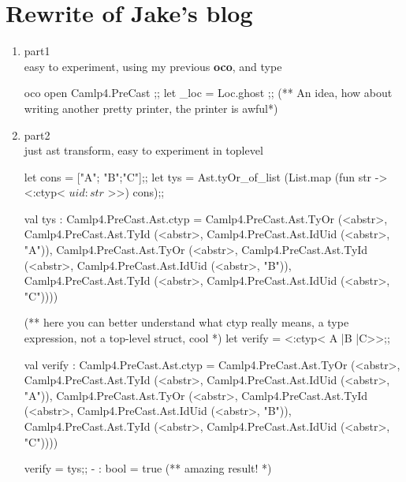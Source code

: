 \section {Rewrite of Jake's blog}
  \begin{enumerate}
  \item part1 \\
    easy to experiment, using my previous {\bf oco},
    and type

    \begin{bluecode}
oco       
open Camlp4.PreCast ;;
let _loc = Loc.ghost ;;
(** An idea, how about writing another pretty printer, the printer is awful*)
\end{bluecode}

\item part2 \\ 
  just ast transform, easy to experiment in toplevel
  

\begin{redcode}
let cons = ["A"; "B";"C"];;
let tys = Ast.tyOr_of_list (List.map (fun str -> <:ctyp< $uid:str$ >>) cons);;
\end{redcode}

\begin{bluecode}
val tys : Camlp4.PreCast.Ast.ctyp =
  Camlp4.PreCast.Ast.TyOr (<abstr>,
   Camlp4.PreCast.Ast.TyId (<abstr>, Camlp4.PreCast.Ast.IdUid (<abstr>, "A")),
   Camlp4.PreCast.Ast.TyOr (<abstr>,
    Camlp4.PreCast.Ast.TyId (<abstr>,
     Camlp4.PreCast.Ast.IdUid (<abstr>, "B")),
    Camlp4.PreCast.Ast.TyId (<abstr>,
     Camlp4.PreCast.Ast.IdUid (<abstr>, "C"))))
\end{bluecode}
   
\begin{redcode}
(** here you can better understand what ctyp really means, a type
expression, not a top-level struct, cool 
*)
let verify = <:ctyp< A |B |C>>;;
\end{redcode}

\begin{bluecode}
val verify : Camlp4.PreCast.Ast.ctyp =
  Camlp4.PreCast.Ast.TyOr (<abstr>,
   Camlp4.PreCast.Ast.TyId (<abstr>, Camlp4.PreCast.Ast.IdUid (<abstr>, "A")),
   Camlp4.PreCast.Ast.TyOr (<abstr>,
    Camlp4.PreCast.Ast.TyId (<abstr>,
     Camlp4.PreCast.Ast.IdUid (<abstr>, "B")),
    Camlp4.PreCast.Ast.TyId (<abstr>,
     Camlp4.PreCast.Ast.IdUid (<abstr>, "C"))))
   \end{bluecode}

\begin{alternate}   
verify = tys;;
- : bool = true (** amazing result! *)
\end{alternate}


\end{enumerate}
